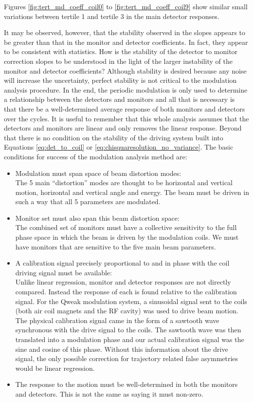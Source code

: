 Figures \ref{fig:tert_md_coeff_coil0} to \ref{fig:tert_md_coeff_coil9} show similar small variations between tertile 1 and tertile 3 in the main detector responses. 

It may be observed, however, that the stability observed in the slopes appears to be greater than that in the monitor and detector coefficients. In fact, they appear to be consistent with statistics. How is the stability of the detector to monitor correction slopes to be understood in the light of the larger instability of the monitor and detector coefficients? Although stability is desired because any noise will increase the uncertainty, perfect stability is not critical to the modulation analysis procedure. In the end, the periodic modulation is only used to determine a relationship between the detectors and monitors and all that is necessary is that there be a well-determined average response of both monitors and detectors over the cycles. It is useful to remember that this whole analysis assumes that the detectors and monitors are linear and only removes the linear response. Beyond that there is no condition on the stability of the driving system built into Equations \ref{eq:det_to_coil} or \ref{eq:chisquaresolution_no_variance}. The basic conditions for success of the modulation analysis method are:
\begin{itemize}
\item{Modulation must span space of beam distortion modes: \\The 5 main ``distortion'' modes are thought to be horizontal and vertical motion, horizontal and vertical angle and energy. The beam must be driven in such a way that all 5 parameters are modulated.}
\item{Monitor set must also span this beam distortion space:\\ The combined set of monitors must have a collective sensitivity to the full phase space in which the beam is driven by the modulation coils. We must have monitors that are sensitive to the five main beam parameters.}
\item{A calibration signal precisely proportional to and in phase with the coil driving signal must be available: \\
Unlike linear regression, monitor and detector responses are not directly compared. Instead the response of each is found relative to the calibration signal. For the Qweak modulation system, a sinusoidal signal sent to the coils (both air coil magnets and the RF cavity) was used to drive beam motion. The physical calibration signal came in the form of a sawtooth wave synchronous with the drive signal to the coils. The sawtooth wave was then translated into a modulation phase and our actual calibration signal was the sine and cosine of this phase. Without this information about the drive signal, the only possible correction for trajectory related false asymmetries would be linear regression.}
\item{The response to the motion must be well-determined in both the monitors and detectors. This is not the same as saying it must non-zero.}
\end{itemize}

